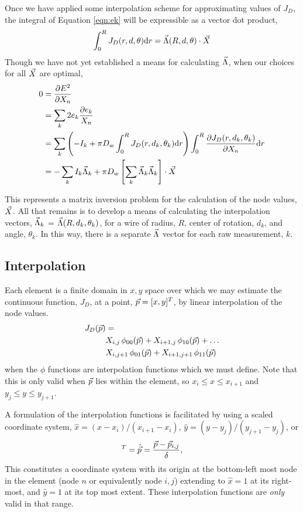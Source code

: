 Once we have applied some interpolation scheme for approximating values of $J_D$, the integral of Equation \ref{eqn:ek} will be expressible as a vector dot product,
\begin{align}
\int_0^R J_D(r, d, \theta)\mathrm{d} r = \vec{\Lambda}(R, d, \theta) \cdot \vec{X} \label{eqn:lambda}
\end{align}
Though we have not yet established a means for calculating $\vec{\Lambda}$, when our choices for all $\vec{X}$ are optimal,
\begin{align}
0 &= \frac{\partial E^2}{\partial X_n} \nonumber\\
& = \sum_k 2 e_k\frac{\partial e_k}{X_n} \nonumber\\
&= \sum_k \left(-I_k + \pi D_w \int_0^R J_D(r, d_k, \theta_k) \mathrm{d}r \right)\int_0^R \frac{\partial J_D(r, d_k, \theta_k)}{\partial X_n} \mathrm{d} r\nonumber\\
&= -\sum_k I_k \vec{\Lambda}_k + \pi D_w \left[\sum_k \vec{\Lambda}_k \vec{\Lambda}_k\right] \cdot \vec{X} \label{eqn:lsqr}
\end{align}

This represents a matrix inversion problem for the calculation of the node values, $\vec{X}$.  All that remains is to develop a means of calculating the interpolation vectors, $\vec{\Lambda}_k$ = $\vec{\Lambda}(R,d_k,\theta_k)$, for a wire of radius, $R$, center of rotation, $d_k$, and angle, $\theta_k$.  In this way, there is a separate $\vec{\Lambda}$ vector for each raw measurement, $k$.

\subsection{Interpolation}\label{sec:interpolate}

Each element is a finite domain in $x,y$ space over which we may estimate the continuous function, $J_D$, at a point, $\vec{p} = [x,y]^T$, by linear interpolation of the node values.  
\begin{align}
J_D(\vec{p}) &= \nonumber\\
 &X_{i,j}\,\phi_{00} (\vec{p}) + X_{i+1,j}\,\phi_{10} (\vec{p}) + \dots\nonumber\\
 &X_{i,j+1}\,\phi_{01} (\vec{p}) + X_{i+1,j+1}\,\phi_{11} (\vec{p})
\end{align}
when the $\phi$ functions are interpolation functions which we must define.  Note that this is only valid when $\vec{p}$ lies within the element, so $x_i \le x \le x_{i+1}$ and $y_j \le y \le y_{j+1}$.

A formulation of the interpolation functions is facilitated by using a scaled coordinate system, $\hat{x} = (x-x_i)/(x_{i+1} - x_i)$, $\hat{y} = (y-y_j)/(y_{j+1} - y_j)$, or
\begin{align}
[\hat{x}, \hat{y}]^T = \hat{\p} = \frac{\p - \p_{i,j}}{\delta},
\end{align}
This constitutes a coordinate system with its origin at the bottom-left most node in the element (node $n$ or equivalently node $i,j$) extending to $\hat{x}=1$ at its right-most, and $\hat{y} = 1$ at its top most extent.  These interpolation functions are \emph{only} valid in that range.

